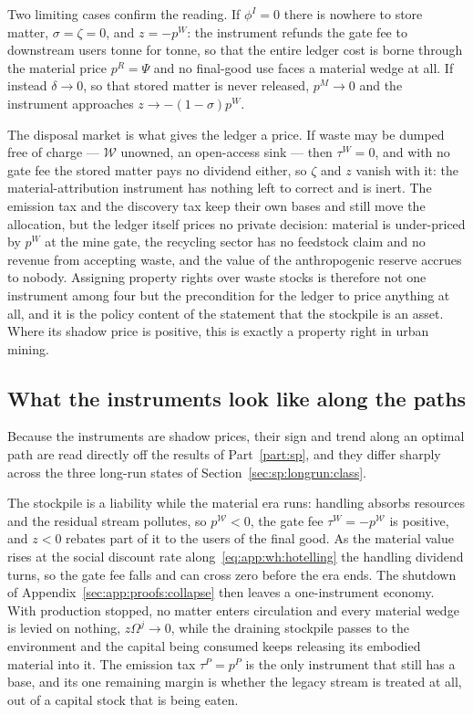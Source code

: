 Two limiting cases confirm the reading. If $\phi^I=0$ there is nowhere to store matter, $\sigma=\zeta=0$, and $z=-p^W$: the instrument refunds the gate fee to downstream users tonne for tonne, so that the entire ledger cost is borne through the material price $p^R=\Psi$ and no final-good use faces a material wedge at all. If instead $\delta\to0$, so that stored matter is never released, $p^M\to0$ and the instrument approaches $z\to-\left(1-\sigma\right)p^W$.

 The disposal market is what gives the ledger a price. If waste may be dumped free of charge --- $\mathcal W$ unowned, an open-access sink --- then $\tau^W=0$, and with no gate fee the stored matter pays no dividend either, so $\zeta$ and $z$ vanish with it: the material-attribution instrument has nothing left to correct and is inert. The emission tax and the discovery tax keep their own bases and still move the allocation, but the ledger itself prices no private decision: material is under-priced by $p^W$ at the mine gate, the recycling sector has no feedstock claim and no revenue from accepting waste, and the value of the anthropogenic reserve accrues to nobody. Assigning property rights over waste stocks is therefore not one instrument among four but the precondition for the ledger to price anything at all, and it is the policy content of the statement that the stockpile is an asset. Where its shadow price is positive, this is exactly a property right in urban mining.

\subsection{What the instruments look like along the paths}\label{sec:mkt:impl:paths}

Because the instruments are shadow prices, their sign and trend along an optimal path are read directly off the results of Part~\ref{part:sp}, and they differ sharply across the three long-run states of Section~\ref{sec:sp:longrun:class}.

 The stockpile is a liability while the material era runs: handling absorbs resources and the residual stream pollutes, so $p^{\mathcal W}<0$, the gate fee $\tau^W=-p^{\mathcal W}$ is positive, and $z<0$ rebates part of it to the users of the final good. As the material value rises at the social discount rate along~\eqref{eq:app:wh:hotelling} the handling dividend turns, so the gate fee falls and can cross zero before the era ends. The shutdown of Appendix~\ref{sec:app:proofs:collapse} then leaves a one-instrument economy. With production stopped, no matter enters circulation and every material wedge is levied on nothing, $z\Omega^j\to0$, while the draining stockpile passes to the environment and the capital being consumed keeps releasing its embodied material into it. The emission tax $\tau^P=p^P$ is the only instrument that still has a base, and its one remaining margin is whether the legacy stream is treated at all, out of a capital stock that is being eaten.

